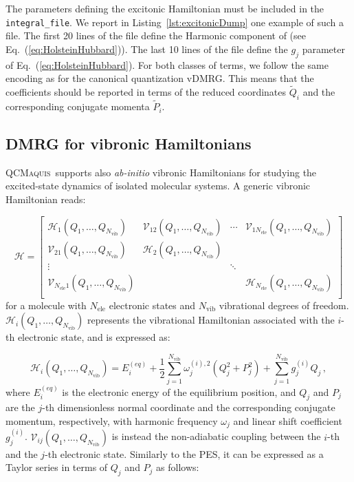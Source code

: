 \documentclass[bibliography=totoc,12pt,a4paper]{scrartcl}
\newcommand{\qcm}{\textsc{QCMaquis}}
\begin{document}
The parameters defining the excitonic Hamiltonian must be included in the \texttt{integral\_file}.
We report in Listing~\ref{lst:excitonicDump} one example of such a file.
The first 20 lines of the file define the Harmonic component of (see Eq.~(\ref{eq:HolsteinHubbard})).
The last 10 lines of the file define the $g_j$ parameter of Eq.~(\ref{eq:HolsteinHubbard}).
For both classes of terms, we follow the same encoding as for the canonical quantization vDMRG.
This means that the coefficients should be reported in terms of the reduced coordinates $\tilde{Q}_i$ and the corresponding conjugate momenta $\tilde{P}_i$.

\subsection{DMRG for vibronic Hamiltonians}
\label{sec:vibronic}

\qcm\ supports also \textit{ab-initio} vibronic Hamiltonians for studying the excited-state dynamics of isolated molecular systems.
A generic vibronic Hamiltonian reads:

\begin{equation}
  \mathcal{H} =
    \begin{bmatrix}
	   \mathcal{H}_1(Q_1,\ldots,Q_{N_\text{vib}})
	     & \mathcal{V}_{12}(Q_1,\ldots,Q_{N_\text{vib}}) 
         & \cdots 
		 & \mathcal{V}_{1 N_\text{ele}}(Q_1,\ldots,Q_{N_\text{vib}}) \\
	   \mathcal{V}_{21}(Q_1,\ldots,Q_{N_\text{vib}})
	     & \mathcal{H}_2(Q_1,\ldots,Q_{N_\text{vib}})
         &  
		 & \\
	  \vdots
	     & 
         & \ddots 
		 & \\
	  \mathcal{V}_{N_\text{ele} 1}(Q_1,\ldots,Q_{N_\text{vib}})
	     &
         &  
		 & \mathcal{H}_{N_\text{ele}}(Q_1,\ldots,Q_{N_\text{vib}}) \\
   \end{bmatrix}
  \label{eq:VibronicHamiltonian}
\end{equation}
%
for a molecule with $N_\text{ele}$ electronic states and $N_\text{vib}$ vibrational degrees of freedom.
$\mathcal{H}_{i}(Q_1,\ldots,Q_{N_\text{vib}})$ represents the vibrational Hamiltonian associated with the $i$-th electronic state, and is expressed as:

\begin{equation}
  \mathcal{H}_{i}(Q_1,\ldots,Q_{N_\text{vib}}) = E_i^{(eq)}
	+ \frac{1}{2} \sum_{j=1}^{N_\text{vib}} \omega_j^{(i),2} \left( Q_j^2  + P_j^2 \right) 
	+ \sum_{j=1}^{N_\text{vib}} g_{j}^{(i)} Q_j \, ,
  \label{eq:DiagonalVibronic}
\end{equation}
%
where $E_i^{(eq)}$ is the electronic energy of the equilibrium position, and $Q_j$ and $P_j$ are the $j$-th dimensionless  normal coordinate and the corresponding conjugate momentum, respectively, with harmonic frequency $\omega_j$ and linear shift coefficient $g_{j}^{(i)}$.
$\mathcal{V}_{ij}(Q_1,\ldots,Q_{N_\text{vib}})$ is instead the non-adiabatic coupling between the $i$-th and the $j$-th electronic state.
Similarly to the PES, it can be expressed as a Taylor series in terms of $Q_j$ and $P_j$ as follows:
\end{document}
